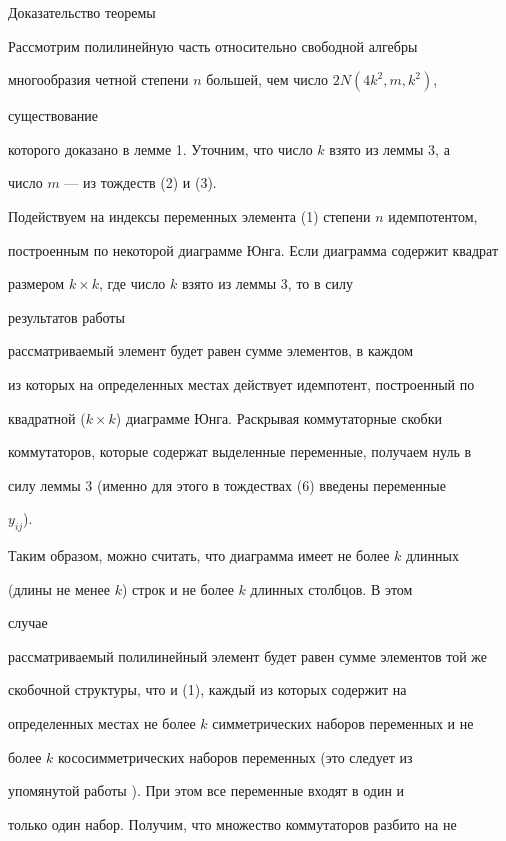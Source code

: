 \begin{pf*}{Доказательство теоремы}


Рассмотрим полилинейную часть относительно свободной алгебры


многообразия четной степени $n$ большей, чем число $2N(4k^2,m,k^2)$,


существование


которого доказано в лемме 1. Уточним, что число $k$ взято из леммы 3, а


число $m$ --- из тождеств (2) и (3).





Подействуем на индексы переменных элемента (1) степени $n$ идемпотентом,


построенным по некоторой диаграмме Юнга. Если диаграмма содержит квадрат


размером $k\times k$, где число $k$ взято из леммы 3, то в силу


результатов работы


\cite{7} рассматриваемый элемент будет равен сумме элементов, в каждом


из которых на определенных местах действует идемпотент, построенный по


квадратной ($k\times k$) диаграмме Юнга. Раскрывая коммутаторные скобки


коммутаторов, которые содержат выделенные переменные, получаем нуль в


силу леммы 3 (именно для этого в тождествах (6) введены переменные


$y_{ij}$).





Таким образом, можно считать, что диаграмма имеет не более $k$ длинных


(длины не менее $k$) строк и не более $k$ длинных столбцов. В этом


случае


рассматриваемый полилинейный элемент будет равен сумме элементов той же


скобочной структуры, что и (1), каждый из которых содержит на


определенных местах не более $k$ симметрических наборов переменных и не


более $k$ кососимметрических наборов переменных (это следует из


упомянутой работы \cite{7}). При этом все переменные входят в один и


только один набор. Получим, что множество коммутаторов разбито на не



\end{pf*}
